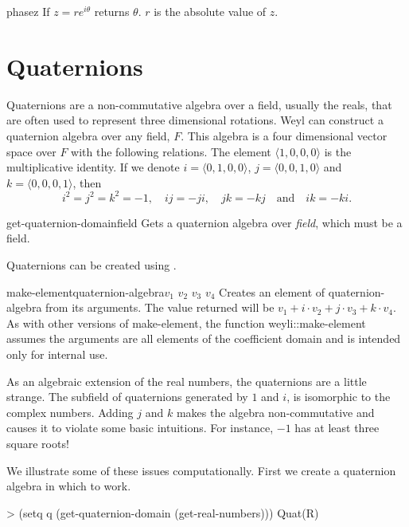 \begin{functiondef}{phase}{z}
If $z = r e^{i\theta}$ returns $\theta$.  $r$ is the absolute value of $z$.
\end{functiondef}

\section{Quaternions}
\label{Quaternion:Sec}
  
Quaternions are a non-commutative algebra over a field, usually the
reals, that are often used to represent three dimensional
rotations. Weyl can construct a quaternion algebra over any field,
$F$. This algebra is a four dimensional vector space over $F$ with the
following relations. The element $\langle 1, 0, 0, 0 \rangle$ is the
multiplicative identity. If we denote $i = \langle 0, 1, 0, 0 \rangle$,
$j = \langle 0, 0, 1, 0 \rangle$ and $k = \langle 0, 0, 0, 1 \rangle$,
then 
\[
i^2 = j^2 = k^2 = -1,\quad ij = - ji,\quad jk = -kj 
\quad\mbox{and}\quad ik = -ki.
\]
  
\begin{functiondef}{get-quaternion-domain}{field}
Gets a quaternion algebra over {\em field}, which must be a field.
\end{functiondef}
  
Quaternions can be created using . 
  
\begin{functiondef}{make-element}{quaternion-algebra}{$v_1$ $v_2$ $v_3$ $v_4$}
Creates an element of quaternion-algebra from its arguments. The value
returned will be $v_1 + i \cdot v_2 + j \cdot v_3 + k \cdot v_4$.  As
with other versions of {\sf make-element}, the function
{\sf weyli::make-element} assumes the arguments are all elements of the
coefficient domain and is intended only for internal use.
\end{functiondef}
  
As an algebraic extension of the real numbers, the quaternions are a
little strange. The subfield of quaternions generated by $1$ and $i$,
is isomorphic to the complex numbers.  Adding $j$ and $k$ makes the
algebra non-commutative and causes it to violate some basic
intuitions. For instance, $-1$ has at least three square roots!
  
We illustrate some of these issues computationally.
First we create a quaternion algebra in which to work.
\begin{code}  
> (setq q (get-quaternion-domain (get-real-numbers)))
Quat(R)
\end{code}
  
